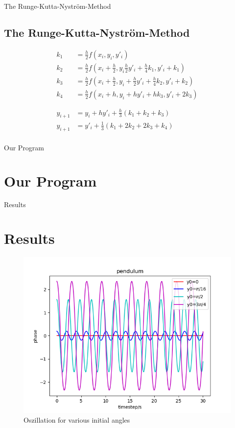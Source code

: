 \documentclass[9pt]{beamer}
\begin{document}
\begin{frame}{The Runge-Kutta-Nyström-Method}
\subsection{The Runge-Kutta-Nyström-Method}
\begin{align*}
k_1 &= \frac{h}{2}f(x_i,y_i,y'_i) \\
k_2 &= \frac{h}{2}f(x_i+\frac{h}{2},y_i\frac{h}{2}y'_i+\frac{h}{4}k_1,y'_i+k_1) \\
k_3 &= \frac{h}{2}f(x_i+\frac{h}{2},y_i+\frac{h}{2}y'_i+\frac{h}{4}k_2,y'_i+k_2) \\
k_4 &= \frac{h}{2}f(x_i+h,y_i+hy'_i+hk_3,y'_i+2k_3) \\
\\
\\
y_{i+1} &= y_i + hy'_i+\frac{h}{3}(k_1+k_2+k_3)\\
y_{i+1} &= y'_i +\frac{1}{3}(k_1+2k_2+2k_3+k_4)\\
\end{align*}
\end{frame}

\begin{frame}{Our Program}
\section{Our Program}

\end{frame}

\begin{frame}{Results}
\section{Results}
\begin{figure}
\centering
	\includegraphics[scale=0.5]{Figure_1.png}
	\caption{Oszillation for various initial angles}
\end{figure}

\end{frame}
\end{document}
